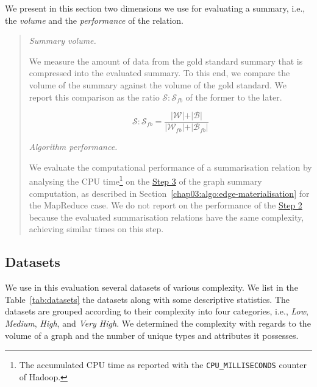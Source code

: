 We present in this section two dimensions we use for evaluating a summary, i.e., the \emph{volume} and the \emph{performance} of the relation.

\begin{quotation}
	\item[\emph{Summary volume.}]
	
	We measure the amount of data from the gold standard summary that is compressed into the evaluated summary. To this end, we compare the volume of the summary against the volume of the gold standard. We report this comparison as the ratio  $\mathcal{S}:\mathcal{S}_{fb}$ of the former to the later.
	
	$$
	\mathcal{S}:\mathcal{S}_{fb} = \frac{\vert \mathcal{W} \vert + \vert \mathcal{B} \vert}{\vert \mathcal{W}_{fb} \vert + \vert \mathcal{B}_{fb} \vert}
	$$
	
	\item[\emph{Algorithm performance.}]
	
	We evaluate the computational performance of a summarisation relation by analysing the CPU time\footnote{The accumulated CPU time as reported with the \texttt{CPU\_MILLISECONDS} counter of Hadoop.} on the \hyperref[step-he]{Step 3} of the graph summary computation, as described in Section~\ref{chap03:algo:edge-materialisation} for the MapReduce case. We do not report on the performance of the \hyperref[step-hn]{Step 2} because the evaluated summarisation relations have the same complexity, achieving similar times on this step.
\end{quotation}

\subsection{Datasets}
\label{sec:eval:datasets}

We use in this evaluation several datasets of various complexity. We list in the Table~\ref{tab:datasets} the datasets along with some descriptive statistics. The datasets are grouped according to their complexity into four categories, i.e., \emph{Low}, \emph{Medium}, \emph{High}, and \emph{Very High}. We determined the complexity with regards to the volume of a graph and the number of unique types and attributes it possesses.

